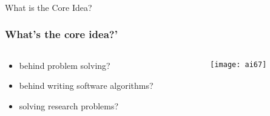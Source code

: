 
\begin{frame}[fragile]\frametitle{}
\begin{center}
{\Large What is the Core Idea?}
\end{center}
\end{frame}

\begin{frame}[fragile]\frametitle{What's the core idea?'}


\begin{columns}
    \begin{column}[T]{0.6\linewidth}

\begin{itemize}
\item behind problem solving?
\item behind writing software algorithms?
\item solving research problems?
\end{itemize}

    \end{column}
    \begin{column}[T]{0.4\linewidth}

			\begin{center}
			\texttt{[image: ai67]}
			\end{center}
			
    \end{column}
  \end{columns}
\end{frame}

